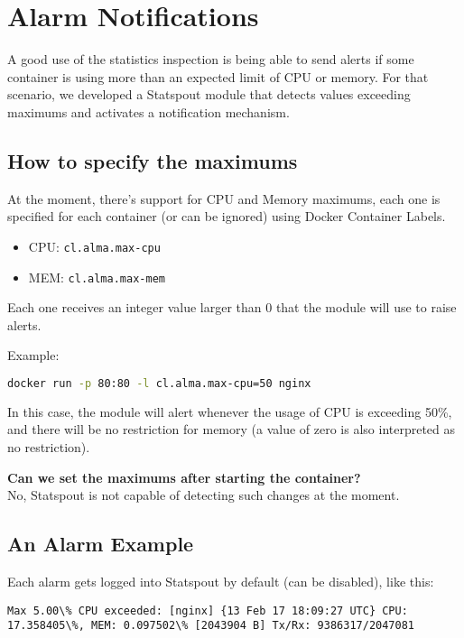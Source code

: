 \chapter{Alarm Notifications}

A good use of the statistics inspection is being able to send alerts if some container is using more than an expected limit of CPU or memory. For that scenario, we developed a Statspout module that detects values exceeding maximums and activates a notification mechanism.

\section{How to specify the maximums}

At the moment, there's support for CPU and Memory maximums, each one is specified for each container (or can be ignored) using Docker Container Labels.

\begin{itemize}
    \item CPU: \texttt{cl.alma.max-cpu}
    \item MEM: \texttt{cl.alma.max-mem}
\end{itemize}

Each one receives an integer value larger than 0 that the module will use to raise alerts.

Example:

\begin{lstlisting}[language=bash]
docker run -p 80:80 -l cl.alma.max-cpu=50 nginx
\end{lstlisting}

In this case, the module will alert whenever the usage of CPU is exceeding 50\%, and there will be no restriction for memory (a value of zero is also interpreted as no restriction).

\textbf{Can we set the maximums after starting the container?} \\
No, Statspout is not capable of detecting such changes at the moment.

\section{An Alarm Example}

Each alarm gets logged into Statspout by default (can be disabled), like this:

\begin{lstlisting}
Max 5.00\% CPU exceeded: [nginx] {13 Feb 17 18:09:27 UTC} CPU: 17.358405\%, MEM: 0.097502\% [2043904 B] Tx/Rx: 9386317/2047081
\end{lstlisting}

